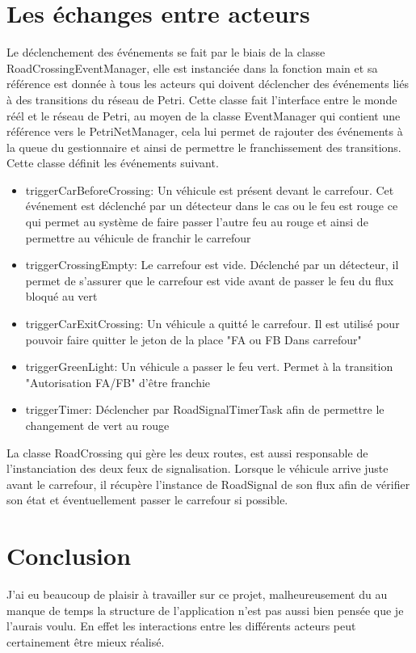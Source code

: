 \documentclass[11pt,a4paper, openany]{memoir}
\begin{document}
\chapter{Les échanges entre acteurs}

Le déclenchement des événements se fait par le biais de la classe RoadCrossingEventManager, elle est instanciée dans la fonction main et sa référence est donnée à tous les acteurs qui doivent déclencher des événements liés à des transitions du réseau de Petri. Cette classe fait l'interface entre le monde réél et le réseau de Petri, au moyen de la classe EventManager qui contient une référence vers le PetriNetManager, cela lui permet de rajouter des événements à la queue du gestionnaire et ainsi de permettre le franchissement des transitions.
Cette classe définit les événements suivant.\\
\begin{itemize}
\item triggerCarBeforeCrossing: Un véhicule est présent devant le carrefour. Cet événement est déclenché par un détecteur  dans le cas ou le feu est rouge ce qui permet au système de faire passer l'autre feu au rouge et ainsi de permettre au véhicule de franchir le carrefour
\item triggerCrossingEmpty: Le carrefour est vide. Déclenché par un détecteur, il permet de s'assurer que le carrefour est vide avant de passer le feu du flux bloqué au vert
\item triggerCarExitCrossing: Un véhicule a quitté le carrefour. Il est utilisé pour pouvoir faire quitter le jeton de la place "FA ou FB Dans carrefour"
\item triggerGreenLight: Un véhicule a passer le feu vert. Permet à la transition "Autorisation FA/FB" d'être franchie
\item triggerTimer: Déclencher par RoadSignalTimerTask afin de permettre le changement de vert au rouge\\
\end{itemize}
La classe RoadCrossing qui gère les deux routes, est aussi responsable de l'instanciation des deux feux de signalisation. Lorsque le véhicule arrive juste avant le carrefour, il récupère l'instance de RoadSignal de son flux afin de vérifier son état et éventuellement passer le carrefour si possible.

\chapter{Conclusion}

J'ai eu beaucoup de plaisir à travailler sur ce projet, malheureusement du au manque de temps la structure de l'application n'est pas aussi bien pensée que je l'aurais voulu. En effet les interactions entre les différents acteurs peut certainement être mieux réalisé.



%
\end{document}

